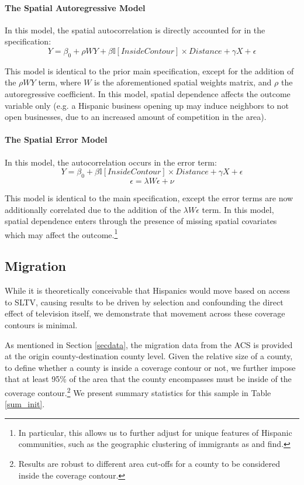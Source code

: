 \documentclass[11pt]{article}
\begin{document}
\paragraph{The Spatial Autoregressive Model}

In this model, the spatial autocorrelation is directly accounted for in the specification:
\[ Y = \beta_0 + \rho W Y + \beta \mathbb{I}[InsideContour] \times Distance + \gamma X + \epsilon \]

This model is identical to the prior main specification, except for the addition of the $\rho W Y$ term, where $W$ is the aforementioned spatial weights matrix, and $\rho$ the autoregressive coefficient. In this model, spatial dependence affects the outcome variable only (e.g. a Hispanic business opening up may induce neighbors to not open businesses, due to an increased amount of competition in the area).

\paragraph{The Spatial Error Model}

In this model, the autocorrelation occurs in the error term:
\[ Y = \beta_0 + \beta \mathbb{I}[InsideContour] \times Distance + \gamma X + \epsilon \]
\[\epsilon = \lambda W \epsilon + \nu\]

This model is identical to the main specification, except the error terms are now additionally correlated due to the addition of the $\lambda W \epsilon$ term. In this model, spatial dependence enters through  the presence of missing spatial covariates which may affect the outcome.\footnote{ In particular, this allows us to further adjust for unique features of Hispanic communities, such as the geographic clustering of immigrants as \cite{cutler_when_2008} and \cite{cascio_cracks_2012} find.}

\subsection{Migration}

While it is theoretically conceivable that Hispanics would move based on access to SLTV, causing results to be driven by selection and confounding the direct effect of television itself, we demonstrate that movement across these coverage contours is minimal.

As mentioned in Section \ref{secdata}, the migration data from the ACS is provided at the origin county-destination county level. Given the relative size of a county, to define whether a county is inside a coverage contour or not, we further impose that at least 95\% of the area that the county encompasses must be inside of the coverage contour.\footnote{ Results are robust to different area cut-offs for a county to be considered inside the coverage contour.} We present summary statistics for this sample in Table \ref{sum_init}.
\end{document}

